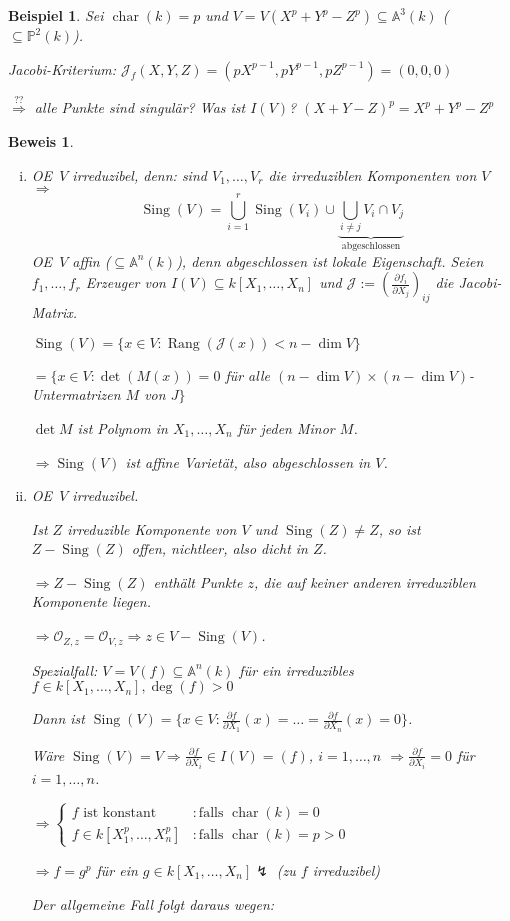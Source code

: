 \documentclass[a4paper, 12pt, numbers=noendperiod, chapterprefix=true, headsepline]{scrbook}
\theoremstyle{break}
\theoremstyle{nonumberbreak}
\newtheorem{nnBsp}{Beispiel}
\newtheorem{Bew}{Beweis}
\theoremstyle{nonumberplain}
\newcommand{\quot}[1]{\textrm{\glqq}{#1}\textrm{\grqq}}
\DeclareMathOperator{\Rang}{Rang}
\DeclareMathOperator{\Sing}{Sing}
\DeclareMathOperator{\chara}{char}
\newcommand{\A}{\mathbb{A}}
\newcommand{\IP}{\mathbb{P}}%
\newcommand{\calJ}{\mathcal{J}}
\newcommand{\calO}{\mathcal{O}}
\renewcommand{\OE}{O\!\!E~}
\begin{document}
\begin{nnBsp}
Sei $\chara(k)=p$ und $V=V(X^p+Y^p-Z^p)\subseteq\A^3(k)$ ($\subseteq\IP^2(k)$).

Jacobi-Kriterium: $\calJ_f(X,Y,Z)=(pX^{p-1}, pY^{p-1}, pZ^{p-1})=(0,0,0)$

$\overset{??}{\Rightarrow}$ alle Punkte sind singul\"ar? Was ist $I(V)$?
$(X+Y-Z)^p=X^p+Y^p-Z^p$
\end{nnBsp}


\begin{Bew}\begin{enumerate}[i)]
\item
	\OE $V$ irreduzibel, denn: sind $V_1,\ldots, V_r$ die irreduziblen Komponenten von $V$ $\Rightarrow $ 
		\[\Sing(V)=\bigcup\limits_{i=1}^r \Sing(V_i)\cup \underbrace{\bigcup\limits_{i\ne j}V_i\cap V_j}_{\text{abgeschlossen}}\]
	\OE $V$ affin ($\subseteq\A^n(k)$), denn \quot{abgeschlossen} ist lokale Eigenschaft. Seien $f_1,\ldots ,f_r$ Erzeuger von $I(V)\subseteq k[X_1,\ldots ,X_n]$ und $\calJ:=(\frac{\partial f_i}{\partial X_j})_{ij}$ die Jacobi-Matrix.
	
	$\Sing(V)=\{x\in V: \Rang(\calJ(x))<n-\dim V\}$
	
	$=\{x\in V:\det(M(x))=0$ f\"ur alle $(n-\dim V)\times(n-\dim V)$-Untermatrizen $M$ von $J\}$
	
	$\det M$ ist Polynom in $X_1,\ldots ,X_n$ f\"ur jeden Minor $M$.
	
	$\Rightarrow \Sing(V)$ ist affine Variet\"at, also abgeschlossen in $V$.
\item
	\OE $V$ irreduzibel.
	
	Ist $Z$ irreduzible Komponente von $V$ und $\Sing(Z)\ne Z$, so ist $Z-\Sing(Z)$ offen, nichtleer, also dicht in $Z$.
	
	$\Rightarrow Z-\Sing(Z)$ enth\"alt Punkte $z$, die auf keiner anderen irreduziblen Komponente liegen.
	
	$\Rightarrow \calO_{Z,z}=\calO_{V,z}\Rightarrow z\in V-\Sing(V)$.
	
	\emph{Spezialfall}: $V=V(f)\subseteq\A^n(k)$ f\"ur ein irreduzibles $f\in k[X_1,\ldots ,X_n], \deg(f)>0$
	
	Dann ist $\Sing(V)=\{x\in V: \frac{\partial f}{\partial X_1}(x)=\ldots =\frac{\partial f}{\partial X_n}(x)=0\}$.
	
	W\"are $\Sing(V)=V\Rightarrow \frac{\partial f}{\partial X_i}\in I(V)=(f)$, $i=1,\ldots ,n$ $\Rightarrow \frac{\partial f}{\partial X_i}=0$ f\"ur $i=1,\ldots ,n$.
	
	$\Rightarrow \left\{\begin{array}{ll}
		f \text{ ist konstant} & :\text{falls } \chara(k)=0\\
		f\in k[X_1^p,\ldots ,X_n^p] & :\text{falls }\chara(k)=p>0
	\end{array}\right.$
	
	$\Rightarrow f=g^p$ f\"ur ein $g\in k[X_1,\ldots ,X_n] \lightning$ (zu $f$ irreduzibel)
	
	Der allgemeine Fall folgt daraus wegen:
\end{enumerate}\end{Bew}
\end{document}
